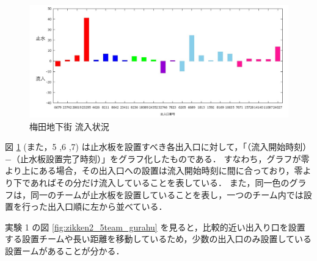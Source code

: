 \documentclass[a4paper,10pt]{jarticle}
\begin{document}
\vspace{-4mm}
\begin{figure}[H]
\centering
\includegraphics[scale=0.2]{zikken1_gurahu}
\vspace{-4mm}
\caption{梅田地下街 流入状況 }
\label{fig:zikken1_gurahu}
\end{figure}
図 \ref{fig:zikken1_gurahu} (また，5 ,6 ,7) は止水板を設置すべき各出入口に対して，「（流入開始時刻）$-$（止水板設置完了時刻）」をグラフ化したものである．
すなわち，グラフが零より上にある場合，その出入口への設置は流入開始時刻に間に合っており，零より下であればその分だけ流入していることを表している．
また，同一色のグラフは，同一のチームが止水板を設置していることを表し，一つのチーム内では設置を行った出入口順に左から並べている．

実験 1 の図 \ref{fig:zikken2_5team_gurahu} を見ると，比較的近い出入り口を設置する設置チームや長い距離を移動しているため，少数の出入口のみ設置している設置ームがあることが分かる．
\vspace{-4mm}
\end{document}
